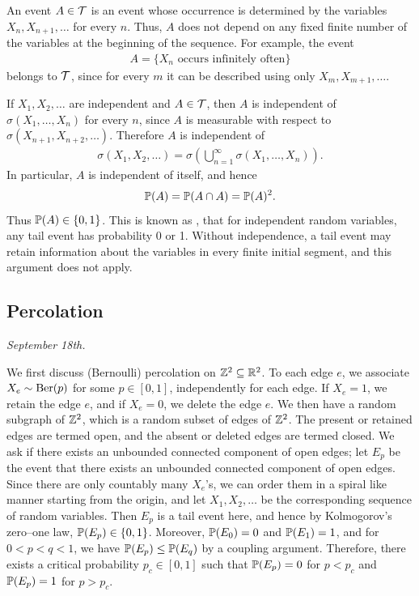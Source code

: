 An event $A \in \mathcal{T}$ is an event whose occurrence is determined by the
variables $X_{n},X_{n+1},\ldots$ for every $n$. Thus, $A$ does not depend on any fixed finite number of the variables at the beginning of the sequence. For example, the event
\begin{align}
    A = \{X_{n} \text{ occurs infinitely often}\}
\end{align}
belongs to $\mathcal{T}$, since for every $m$ it can be described using only
$X_{m},X_{m+1},\ldots$.

If $X_{1},X_{2},\ldots$ are independent and $A \in \mathcal{T}$, then $A$ is
independent of $\sigma(X_{1},\ldots,X_{n})$ for every $n$, since $A$ is
measurable with respect to $\sigma(X_{n+1},X_{n+2},\ldots)$. Therefore $A$ is
independent of
\begin{align}
    \sigma(X_{1},X_{2},\ldots) = \sigma\left(\bigcup_{n=1}^{\infty}
    \sigma(X_{1},\ldots,X_{n})\right).
\end{align}
In particular, $A$ is independent of itself, and hence
\begin{align}
    \mathbb{P}(A) = \mathbb{P}(A \cap A) = \mathbb{P}(A)^{2}.
\end{align}
Thus $\mathbb{P}(A) \in \{0,1\}$. This is known as , that for independent random variables, any tail event has probability 0 or 1. Without independence, a tail event may retain information about the variables in every finite initial segment, and this argument does not apply.

\subsection{Percolation}
\textit{September 18th.}

We first discuss (Bernoulli) percolation on $\mathbb{Z}^{2} \subseteq \mathbb{R}^{2}$. To each edge $e$, we associate $X_{e} \sim \operatorname{Ber}(p)$ for some $p \in [0,1]$, independently for each edge. If $X_{e} = 1$, we retain the edge $e$, and if $X_{e} = 0$, we delete the edge $e$. We then have a random subgraph of $\mathbb{Z}^{2}$, which is a random subset of edges of $\mathbb{Z}^{2}$. The present or retained edges are termed open, and the absent or deleted edges are termed closed. We ask if there exists an unbounded connected component of open edges; let $E_{p}$ be the event that there exists an unbounded connected component of open edges. Since there are only countably many $X_{e}$'s, we can order them in a spiral like manner starting from the origin, and let $X_{1},X_{2},\ldots$ be the corresponding sequence of random variables. Then $E_{p}$ is a tail event here, and hence by Kolmogorov's zero--one law, $\mathbb{P}(E_{p}) \in \{0,1\}$. Moreover, $\mathbb{P}(E_{0}) = 0$ and $\mathbb{P}(E_{1}) = 1$, and for $0 < p < q < 1$, we have $\mathbb{P}(E_{p}) \leq \mathbb{P}(E_{q})$ by a coupling argument. Therefore, there exists a critical probability $p_{c} \in [0,1]$ such that $\mathbb{P}(E_{p}) = 0$ for $p < p_{c}$ and $\mathbb{P}(E_{p}) = 1$ for $p > p_{c}$.

